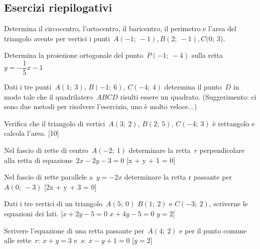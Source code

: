 \subsection{Esercizi riepilogativi}

\begin{esercizio}\label{ese:02_01.}
Determina il circocentro, l'ortocentro, il baricentro, il perimetro e l'area 
del triangolo avente per vertici i punti~$A(-1;~-1), B(2;~-1 ), C(0;~3$).  
\end{esercizio}

\begin{esercizio}\label{ese:02_01.}
Determina la proiezione ortogonale del punto~$P(-1;~-4)$ sulla 
retta~$y = - \dfrac{1}{5} x - 1$ 
\end{esercizio}

\begin{esercizio}\label{ese:02_01.}
Dati i tre punti~$A(1;~3)$, $B(-1;~6)$, $C(-4;~4)$ 
determina il punto~$D$ in modo tale che il quadrilatero~$ABCD$ risulti essere 
un quadrato. 
(Suggerimento: ci sono due metodi per risolvere l'esercizio, uno è molto 
veloce...) 
\end{esercizio}

\begin{esercizio}\label{ese:02_01.}
Verifica che il triangolo di vertici~$A(3;~2)$, $B(2;~5)$, $C(-4;~3)$ è 
rettangolo e calcola l'area. \hfill[10]
\end{esercizio}

\begin{esercizio}\label{ese:02_01.}
Nel fascio di rette di centro~$A(-2;~1)$ determinare la retta~$r$ 
perpendicolare alla retta di equazione~$2x - 2y - 3 = 0$ \hfill[x + y + 1 = 0]
\end{esercizio}

\begin{esercizio}\label{ese:02_01.}
Nel fascio di rette parallele a~$y = -2x$ determinare la retta r 
passante per~$A(0;~-3)$ \hfill[2x + y + 3 = 0]
\end{esercizio}

\begin{esercizio}\label{ese:02_01.}
Dati i tre vertici di un triangolo~$A(5;~0)$ $B(1;~2)$ e $C(-3;~2)$, 
scriverne le equazioni dei lati.
 \hfill[$x + 2y - 5 = 0$  $x + 4 y - 5 = 0$ $y = 2$]
\end{esercizio}

\begin{esercizio}\label{ese:02_01.}
Scrivere l'equazione di una retta passante per~$A(4;~2)$ 
e per il punto comune alle rette~$r:~x + y = 3$ e~$s:~x - y + 1 = 0$
\hfill[$y = 2$]
\end{esercizio}


